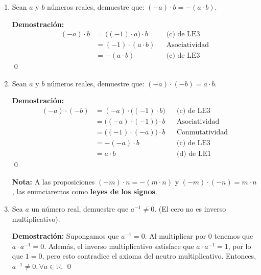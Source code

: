 \documentclass[11pt]{article}
\newcommand{\R}{\mathbb{R}}
\begin{document}
\begin{enumerate}[label=\alph*)]
        \item Sean $a$ y $b$ números reales, demuestre que: $ (-a) \cdot b = -(a \cdot b) $.
        
        \textbf{Demostración:} \begin{align*}
        (-a) \cdot b &= \bigl( \left(-1 \right) \cdot a \bigr) \cdot b && \text{(c) de LE3}\\
        &= (-1) \cdot (a \cdot b) && \text{Asociatividad}\\
        &= -(a \cdot b) && \text{(c) de LE3}
        \end{align*} \qed

        \item Sean $a$ y $b$ números reales, demuestre que: $ (-a) \cdot (-b) = a \cdot b $. 
        
        \textbf{Demostración:} \begin{align*}
            (-a) \cdot (-b) &= (-a) \cdot \bigl( (-1) \cdot b \bigr) && \text{(c) de LE3}\\
            &= \bigl( (-a) \cdot (-1) \bigr) \cdot b && \text{Asociatividad}\\
            &= \bigl( (-1) \cdot (-a) \bigr) \cdot b && \text{Conmutatividad}\\
            &= -(-a) \cdot b && \text{(c) de LE3}\\
            &= a \cdot b && \text{(d) de LE1}
        \end{align*} \qed

        \textbf{Nota:} A las proposiciones $ (-m) \cdot n = -(m \cdot n) $ y $ (-m) \cdot (-n) = m \cdot n $, las enunciaremos como \textbf{leyes de los signos}.
        \item Sea $a$ un número real, demuestre que $a^{-1}\neq 0$. (El cero no es inverso multiplicativo).
        
        \textbf{Demostración:} Supongamos que $a^{-1}=0$. Al multiplicar por $0$ tenemos que $a\cdot a^{-1}=0$. Además, el inverso multiplicativo satisface que $a\cdot a^{-1}=1$, por lo que $1=0$, pero esto contradice el axioma del neutro multiplicativo. Entonces, $a^{-1}\neq 0, \forall a\in \R$. \qed
    \end{enumerate}
\end{document}
